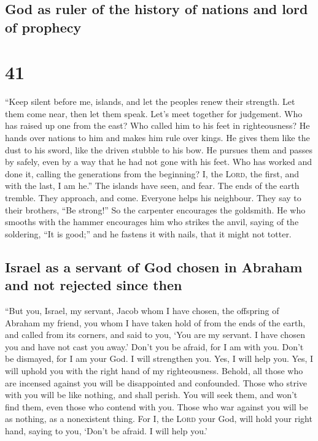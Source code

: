 \hypertarget{god-as-ruler-of-the-history-of-nations-and-lord-of-prophecy}{%
\subsection{God as ruler of the history of nations and lord of
prophecy}\label{god-as-ruler-of-the-history-of-nations-and-lord-of-prophecy}}

\hypertarget{section-40}{%
\section{41}\label{section-40}}

 ``Keep silent before me, islands, and let the peoples
renew their strength. Let them come near, then let them speak. Let's
meet together for judgement.  Who has raised up one from
the east? Who called him to his feet in righteousness? He hands over
nations to him and makes him rule over kings. He gives them like the
dust to his sword, like the driven stubble to his bow.  He
pursues them and passes by safely, even by a way that he had not gone
with his feet.  Who has worked and done it, calling the
generations from the beginning? I, the \textsc{Lord}, the first, and
with the last, I am he.''  The islands have seen, and
fear. The ends of the earth tremble. They approach, and come.
 Everyone helps his neighbour. They say to their brothers,
``Be strong!''  So the carpenter encourages the goldsmith.
He who smooths with the hammer encourages him who strikes the anvil,
saying of the soldering, ``It is good;'' and he fastens it with nails,
that it might not totter.

\hypertarget{israel-as-a-servant-of-god-chosen-in-abraham-and-not-rejected-since-then}{%
\subsection{Israel as a servant of God chosen in Abraham and not
rejected since
then}\label{israel-as-a-servant-of-god-chosen-in-abraham-and-not-rejected-since-then}}

 ``But you, Israel, my servant, Jacob whom I have chosen,
the offspring of Abraham my friend,  you whom I have taken
hold of from the ends of the earth, and called from its corners, and
said to you, `You are my servant. I have chosen you and have not cast
you away.'  Don't you be afraid, for I am with you. Don't
be dismayed, for I am your God. I will strengthen you. Yes, I will help
you. Yes, I will uphold you with the right hand of my righteousness.
 Behold, all those who are incensed against you will be
disappointed and confounded. Those who strive with you will be like
nothing, and shall perish.  You will seek them, and won't
find them, even those who contend with you. Those who war against you
will be as nothing, as a nonexistent thing.  For I, the
\textsc{Lord} your God, will hold your right hand, saying to you, `Don't
be afraid. I will help you.'

